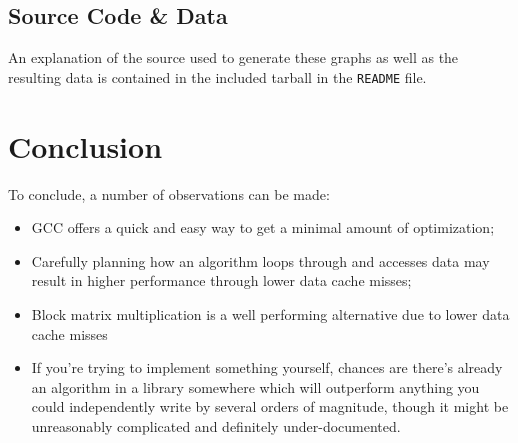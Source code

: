 \documentclass{article}
\begin{document}
\subsection{Source Code \& Data}
An explanation of the source used to generate these graphs as well as the resulting data is contained in the included tarball in the \texttt{README} file.

\section{Conclusion}
To conclude, a number of observations can be made: 
\begin{itemize}
    \item GCC offers a quick and easy way to get a minimal amount of optimization;
    \item Carefully planning how an algorithm loops through and accesses data may result in higher performance through lower data cache misses;
    \item Block matrix multiplication is a well performing alternative due to lower data cache misses
    \item If you're trying to implement something yourself, chances are there's already an algorithm in a library somewhere which will outperform anything you could independently write by several orders of magnitude, though it might be unreasonably complicated and definitely under-documented.
\end{itemize}
\end{document}
